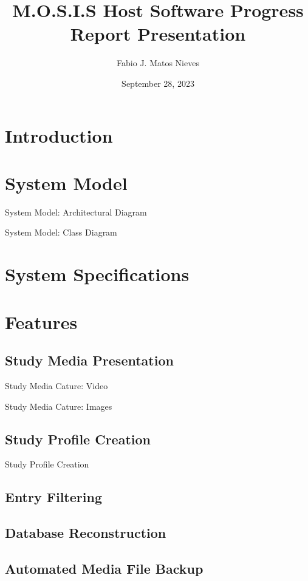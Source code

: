 \documentclass[17pt, aspectratio=169]{beamer}
\title{M.O.S.I.S Host Software Progress Report Presentation}
\author[Fabio J. Matos Nieves]{Fabio J. Matos Nieves}
\institute[UPRM]{University of Puerto Rico Mayagüez Campus}
\date{September 28, 2023}
\begin{document}
\begin{frame}
	\maketitle
\end{frame}
\begin{frame}
	\tableofcontents
\end{frame}
\section{Introduction}
\section{System Model}
\begin{frame}{System Model: Architectural Diagram}
 
\end{frame}
\begin{frame}{System Model: Class Diagram}
 
\end{frame}
\section{System Specifications}
\section{Features}
\subsection{Study Media Presentation}
\begin{frame}{Study Media Cature: Video}
 
\end{frame}
\begin{frame}{Study Media Cature: Images}
 
\end{frame}
\subsection{Study Profile Creation}
\begin{frame}{Study Profile Creation}
\end{frame}
\subsection{Entry Filtering}
\subsection{Database Reconstruction}
\subsection{Automated Media File Backup}
\end{document}
